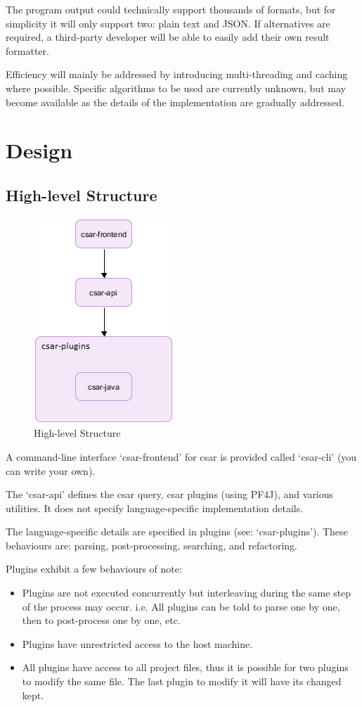 \documentclass[12pt, letterpaper]{article}
\begin{document}
The program output could technically support thousands of formats, but for simplicity it will only support two: plain text and JSON.
If alternatives are required, a third-party developer will be able to easily add their own result formatter.

Efficiency will mainly be addressed by introducing multi-threading and caching where possible.
Specific algorithms to be used are currently unknown, but may become available as the details of the implementation are gradually addressed.

\section{Design}
\subsection{High-level Structure}

\begin{figure}[!hb]
  \centering
  \caption{High-level Structure}
  \includegraphics{figure-1}
\end{figure}

A command-line interface `csar-frontend' for csar is provided called `csar-cli' (you can write your own).

The `csar-api' defines the csar query, csar plugins (using PF4J), and various utilities.
It does not specify language-specific implementation details.

The language-specific details are specified in plugins (see: `csar-plugins').
These behaviours are: parsing, post-processing, searching, and refactoring.

Plugins exhibit a few behaviours of note:
\begin{itemize}
  \item Plugins are not executed concurrently but interleaving during the same step of the process may occur.
  i.e. All plugins can be told to parse one by one, then to post-process one by one, etc.
  \item Plugins have unrestricted access to the host machine.
  \item All plugins have access to all project files, thus it is possible for two plugins to modify the same file.
  The last plugin to modify it will have its changed kept.
\end{itemize}
\end{document}
